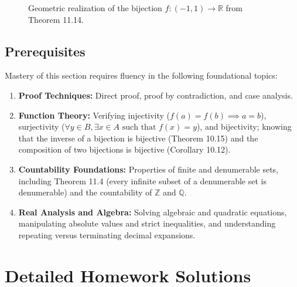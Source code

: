 \documentclass[11pt, letterpaper]{article}
\theoremstyle{definition}
\theoremstyle{remark}
\begin{document}
\begin{figure}[htbp]
\caption{Geometric realization of the bijection $f : (-1, 1) \to \mathbb{R}$ from Theorem 11.14.}
\label{fig:bijection_plot}
\end{figure}

\subsection{Prerequisites}

Mastery of this section requires fluency in the following foundational topics:
\begin{enumerate}[label=(\arabic*)]
    \item \textbf{Proof Techniques:} Direct proof, proof by contradiction, and case analysis.
    \item \textbf{Function Theory:} Verifying injectivity ($f(a) = f(b) \implies a = b$), surjectivity ($\forall y \in B, \exists x \in A \text{ such that } f(x) = y$), and bijectivity; knowing that the inverse of a bijection is bijective (Theorem 10.15) and the composition of two bijections is bijective (Corollary 10.12).
    \item \textbf{Countability Foundations:} Properties of finite and denumerable sets, including Theorem 11.4 (every infinite subset of a denumerable set is denumerable) and the countability of $\mathbb{Z}$ and $\mathbb{Q}$.
    \item \textbf{Real Analysis and Algebra:} Solving algebraic and quadratic equations, manipulating absolute values and strict inequalities, and understanding repeating versus terminating decimal expansions.
\end{enumerate}

\section{Detailed Homework Solutions}
\end{document}
